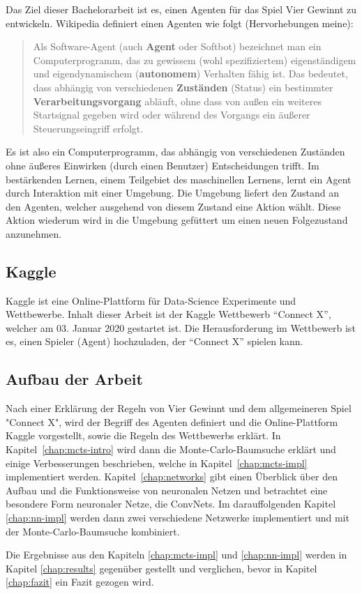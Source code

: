 Das Ziel dieser Bachelorarbeit ist es, einen Agenten für das Spiel Vier Gewinnt zu entwickeln. Wikipedia definiert einen Agenten wie folgt (Hervorhebungen meine):

\begin{quote}
	Als Software-Agent (auch \textbf{Agent} oder Softbot) bezeichnet man ein Computerprogramm, das zu gewissem (wohl spezifiziertem) eigenständigem und eigendynamischem (\textbf{autonomem}) Verhalten fähig ist. Das bedeutet, dass abhängig von verschiedenen \textbf{Zuständen} (Status) ein bestimmter \textbf{Verarbeitungsvorgang} abläuft, ohne dass von außen ein weiteres Startsignal gegeben wird oder während des Vorgangs ein äußerer Steuerungseingriff erfolgt.
	\autocite{SoftwareAgent2019}
\end{quote}

Es ist also ein Computerprogramm, das abhängig von verschiedenen Zuständen ohne äußeres Einwirken (durch einen Benutzer) Entscheidungen trifft. Im bestärkenden Lernen, einem Teilgebiet des maschinellen Lernens, lernt ein Agent durch Interaktion mit einer Umgebung. Die Umgebung liefert den Zustand an den Agenten, welcher ausgehend von diesem Zustand eine Aktion wählt. Diese Aktion wiederum wird in die Umgebung gefüttert um einen neuen Folgezustand anzunehmen.


\subsection{Kaggle}
Kaggle ist eine Online-Plattform für Data-Science Experimente und Wettbewerbe. 
Inhalt dieser Arbeit ist der Kaggle Wettbewerb “Connect X”, welcher am 03. Januar 2020 gestartet ist. Die Herausforderung im Wettbewerb ist es, einen Spieler (Agent) hochzuladen, der “Connect X” spielen kann.

\subsection{Aufbau der Arbeit}
Nach einer Erklärung der Regeln von Vier Gewinnt und dem allgemeineren Spiel "Connect X", wird der Begriff des Agenten definiert und die Online-Plattform Kaggle vorgestellt, sowie die Regeln des Wettbewerbs erklärt. In Kapitel~\ref{chap:mcts-intro} wird dann die Monte-Carlo-Baumsuche erklärt und einige Verbesserungen beschrieben, welche in Kapitel~\ref{chap:mcts-impl} implementiert werden. Kapitel~\ref{chap:networks} gibt einen Überblick über den Aufbau und die Funktionsweise von neuronalen Netzen und betrachtet eine besondere Form neuronaler Netze, die ConvNets. Im darauffolgenden Kapitel \ref{chap:nn-impl} werden dann zwei verschiedene Netzwerke implementiert und mit der Monte-Carlo-Baumsuche kombiniert.

Die Ergebnisse aus den Kapiteln \ref{chap:mcts-impl} und \ref{chap:nn-impl} werden in Kapitel \ref{chap:results} gegenüber gestellt und verglichen, bevor in Kapitel \ref{chap:fazit} ein Fazit gezogen wird.
